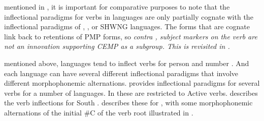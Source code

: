  mentioned in ,
it is important for comparative purposes to note that the inflectional
paradigms for verbs in  languages are only partially
cognate with the inflectional paradigms of ,
, or SHWNG languages.
The forms that are cognate link back to retentions of PMP forms,
so \it{contra} \citet[258]{Blust1993}, subject markers on the
verb are not an innovation supporting CEMP as a subgroup.
This is revisited in .

 mentioned above,  languages tend to inflect
verbs for person and number \citep[24--26]{Collins1982c,Collins1983}.
And each language can have several different inflectional paradigms
that involve different morphophonemic alternations.
\citet[118--125]{Stresemann1927} provides inflectional paradigms for
several verbs for a number of  languages.
In  \citep[xxix--xxx]{Collins2003a} these are restricted to Active verbs.
\citet[36--42]{Bolton1990} describes the verb inflections for South .
\citet[86--91]{Laidig1992} describes these for ,
with some morphophonemic alternations of the initial {\#}C of
the verb root illustrated in .

